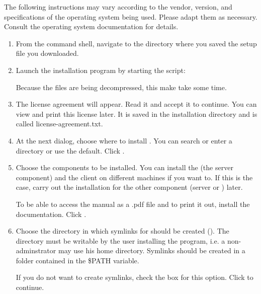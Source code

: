 

The following instructions may vary according to the vendor, version, and specifications of the operating system being used. Please adapt them as necessary. Consult the operating system documentation for details.

\begin{enumerate}
\item From the command shell, navigate to the directory where you saved the setup file you downloaded. 
\item Launch the installation program by starting the script:\\
  
Because the files are being decompressed, this make take some time.  
  \item The license agreement will appear. Read it and accept it to continue.  
You can view and print this license later. It is saved in the \gd{} installation directory and is called license-agreement.txt.   
\item At the next dialog, choose where to install \gd{}. You can search or enter a directory or use the default. Click .

\item Choose the components to be installed.
You can install the \gdserver{} (the server component) and the client on different machines if you want to. If this is the case, carry out the installation for the other component (server or \gdserver{}) later. 

To be able to access the manual as a .pdf file and to  print it  out, install the  \gd{} documentation. Click .


\item Choose the directory in which symlinks for \GD{} should be created (). The directory must be writable by the user installing the program, i.e. a non-adminstrator may use his home directory. Symlinks should be created in a folder contained in  the \$PATH variable.

If you do not want to create symlinks, check the box for this option. Click  to continue.  


\end{enumerate}
